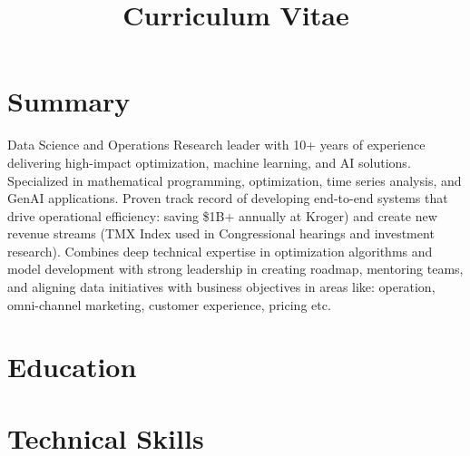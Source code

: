 \documentclass[12pt,a4paper,sans]{moderncv}
\title{Curriculum Vitae}
\begin{document}
\setlength{\parskip}{1em}
\makecvtitle


\section{Summary}
Data Science and Operations Research leader with 10+ years of experience delivering high-impact optimization, machine learning, and AI solutions. Specialized in mathematical programming, optimization, time series analysis, and GenAI applications. Proven track record of developing end-to-end systems that drive operational efficiency: saving \$1B+ annually at Kroger) and create new revenue streams (TMX Index used in Congressional hearings and investment research). Combines deep technical expertise in optimization algorithms and model development with strong leadership in creating roadmap, mentoring teams, and aligning data initiatives with business objectives in areas like: operation, omni-channel marketing, customer experience, pricing etc. 
\section{Education}

\section{Technical Skills}
\end{document}
